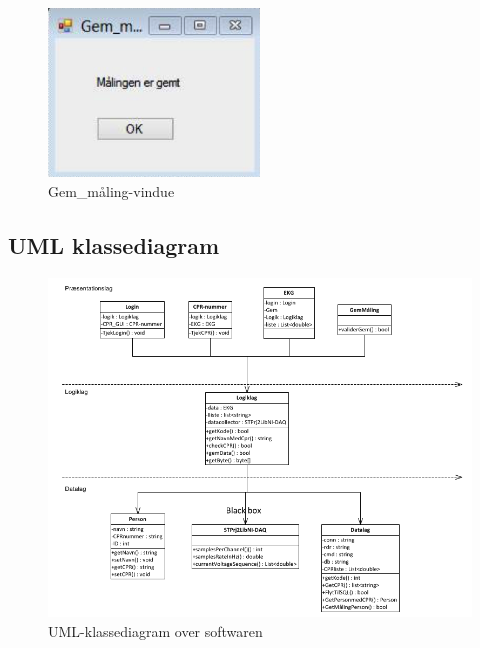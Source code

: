 \begin{figure}[H]
	\centering
	\includegraphics[width=0.5\textwidth]{Figurer/Snip20150430_41}
	\caption{Gem\_måling-vindue}
\end{figure}

\subsection{UML klassediagram}

\begin{figure}[H]
	\centering
	\includegraphics[width=1\textwidth]{Figurer/Snip20150512_9}
	\caption{UML-klassediagram over softwaren}
\end{figure}

